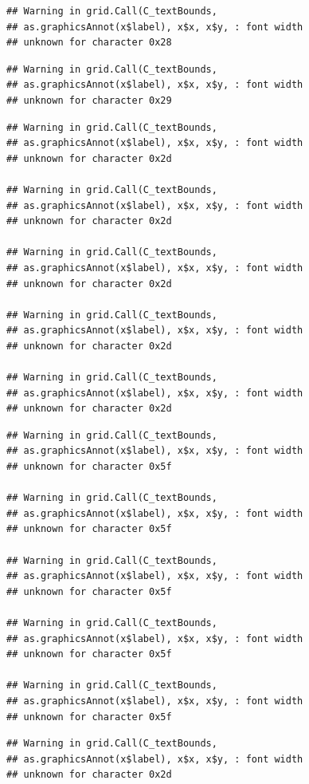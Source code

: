 \documentclass[
]{book}
\begin{document}
\begin{verbatim}
## Warning in grid.Call(C_textBounds,
## as.graphicsAnnot(x$label), x$x, x$y, : font width
## unknown for character 0x28
\end{verbatim}

\begin{verbatim}
## Warning in grid.Call(C_textBounds,
## as.graphicsAnnot(x$label), x$x, x$y, : font width
## unknown for character 0x29
\end{verbatim}

\begin{verbatim}
## Warning in grid.Call(C_textBounds,
## as.graphicsAnnot(x$label), x$x, x$y, : font width
## unknown for character 0x2d

## Warning in grid.Call(C_textBounds,
## as.graphicsAnnot(x$label), x$x, x$y, : font width
## unknown for character 0x2d

## Warning in grid.Call(C_textBounds,
## as.graphicsAnnot(x$label), x$x, x$y, : font width
## unknown for character 0x2d

## Warning in grid.Call(C_textBounds,
## as.graphicsAnnot(x$label), x$x, x$y, : font width
## unknown for character 0x2d

## Warning in grid.Call(C_textBounds,
## as.graphicsAnnot(x$label), x$x, x$y, : font width
## unknown for character 0x2d
\end{verbatim}

\begin{verbatim}
## Warning in grid.Call(C_textBounds,
## as.graphicsAnnot(x$label), x$x, x$y, : font width
## unknown for character 0x5f

## Warning in grid.Call(C_textBounds,
## as.graphicsAnnot(x$label), x$x, x$y, : font width
## unknown for character 0x5f

## Warning in grid.Call(C_textBounds,
## as.graphicsAnnot(x$label), x$x, x$y, : font width
## unknown for character 0x5f

## Warning in grid.Call(C_textBounds,
## as.graphicsAnnot(x$label), x$x, x$y, : font width
## unknown for character 0x5f

## Warning in grid.Call(C_textBounds,
## as.graphicsAnnot(x$label), x$x, x$y, : font width
## unknown for character 0x5f
\end{verbatim}

\begin{verbatim}
## Warning in grid.Call(C_textBounds,
## as.graphicsAnnot(x$label), x$x, x$y, : font width
## unknown for character 0x2d
\end{verbatim}
\end{document}
